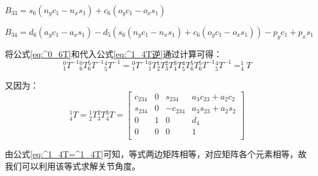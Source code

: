 \documentclass{seuthesis-2022}
\numberwithin{equation}{section}
\begin{document}
$B_{33} = s_6(n_yc_1-n_xs_1) + c_6(o_yc_1-o_xs_1)$

$B_{34} = d_6(a_yc_1-a_xs_1)-d_5\left(s_6(n_yc_1-n_xs_1)+c_6(o_yc_1-o_xs_1)\right) - p_yc_1 + p_xs_1$

将公式\eqref{eq:^0_6T}和代入公式\eqref{eq:^1_4T逆}通过计算可得：
\begin{equation}
  {^0_1T^{-1}} {^0_6T} {^5_6T^{-1}} {^4_5T^{-1}}= {^0_1T^{-1}} {^0_1T} {^1_2T} {^2_3T} {^3_4T} {^4_5T} {^5_6T}{^5_6T^{-1}} {^4_5T^{-1}} = ^1_4T
  \label{eq:^1_4T=^1_4T}
\end{equation}

又因为：
\begin{equation}
  ^1_4T = {^1_2T} {^2_3T} {^3_4T} =
  \begin{bmatrix}
    c_{234} & 0 & s_{234} & a_3c_{23}+a_2c_2\\
    s_{234} & 0 & -c_{234} & a_3s_{23}+a_2s_2\\
    0 & 1 & 0 & d_4\\
    0 & 0 & 0 & 1\\
  \end{bmatrix}
  \label{eq:^1_4T}
\end{equation}

由公式\eqref{eq:^1_4T=^1_4T}可知，等式两边矩阵相等，对应矩阵各个元素相等，故我们可以利用该等式求解关节角度。
\end{document}
